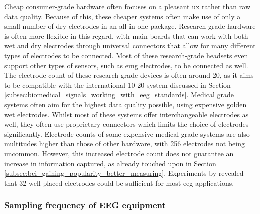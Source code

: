 Cheap consumer-grade hardware often focuses on a pleasant \gls{ux} rather than raw data quality.
Because of this, these cheaper systems often make use of only a small number of dry electrodes in an all-in-one package.
Research-grade hardware is often more flexible in this regard, with main boards that can work with both wet and dry electrodes through universal connectors that allow for many different types of electrodes to be connected.
Most of these research-grade headsets even support other types of sensors, such as \gls{emg} electrodes, to be connected as well. 
The electrode count of these research-grade devices is often around 20, as it aims to be compatible with the international 10-20 system discussed in Section \ref{subsec:biomedical_signals_working_with_eeg_standards}.
Medical grade systems often aim for the highest data quality possible, using expensive golden wet electrodes.
Whilst most of these systems offer interchangeable electrodes as well, they often use proprietary connectors which limits the choice of electrodes significantly.
Electrode counts of some expensive medical-grade systems are also multitudes higher than those of other hardware, with 256 electrodes not being uncommon.
However, this increased electrode count does not guarantee an increase in information captured, as already touched upon in Section \ref{subsec:bci_gaining_popularity_better_measuring}.
Experiments by \citet{ideal_eeg_electrode_count_place} revealed that 32 well-placed electrodes could be sufficient for most \gls{eeg} applications.


\subsubsection{Sampling frequency of EEG equipment}
\label{subsubsec:biomedical_signals_measuring_brain_equipment_sampling_frequency}


